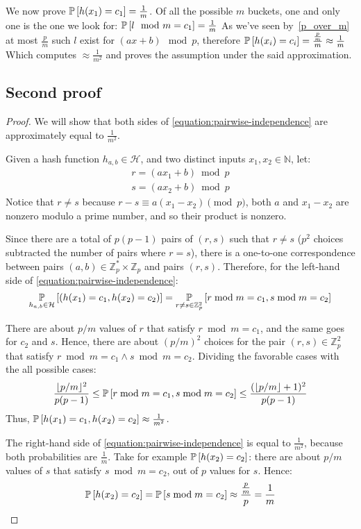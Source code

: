 We now prove $\operatorname*{\mathbb{P}}\left[{h(x_{1}) = c_{1}}\right] = \frac{1}{m}$.
Of all the possible $m$ buckets, one and only one is the one we look for:
$\operatorname*{\mathbb{P}}\left[{l \mod m = c_{1}}\right] = \frac{1}{m}$
As we've seen by~\ref{p_over_m} at most $\frac{p}{m}$ such $l$ exist for $(a x + b) \mod p$,
therefore $\operatorname*{\mathbb{P}}\left[{h(x_i) = c_{i}}\right] = \frac{\frac{p}{m}}{m} \approx \frac{1}{m}$
Which computes $\approx \frac{1}{m^{2}}$ and proves the assumption under the said approximation.

\subsection{Second proof}

\begin{proof}
We will show that both sides of  \eqref{equation:pairwise-independence} are approximately equal to $\frac{1}{m^2}$.

Given a hash function $h_{a,b} \in \mathcal{H}$, and two distinct inputs $x_1, x_2 \in \mathbb{N}$, let:
\begin{align*}
  r = (a x_1 + b) \bmod p\\
  s = (a x_2 + b) \bmod p
\end{align*}
Notice that $r \ne s$ because $r - s \equiv a(x_1-x_2) \pmod p $,  both $a$ and $x_1-x_2$ are nonzero modulo a prime number, and so their product is nonzero.

Since there are a total of $p(p-1)$ pairs of $(r, s)$ such that $r \ne s$ ($p^2$ choices subtracted the number of pairs where $r=s$), there is a one-to-one correspondence between pairs $(a, b)\in \mathbb{Z}_p^*\times\mathbb{Z}_p$ and pairs $(r, s)$. Therefore, for the left-hand side of \eqref{equation:pairwise-independence}:
$$\operatorname*{\mathbb{P}}_{h_{a,b}\in\mathcal{H}}\left[{(h(x_1)= c_1, h(x_2) = c_2)}\right] = \operatorname*{\mathbb{P}}_{r\ne s\in\mathbb{Z}_p^2}\left[{r \bmod m = c_1, s \bmod m = c_2}\right]$$

There are about $p / m$ values of $r$ that satisfy $r \bmod m=c_1$, and the same goes for $c_2$ and $s$. Hence, there are about $(p / m)^2$ choices for the pair $(r, s) \in \mathbb{Z}_p^2$ that satisfy $r \bmod m = c_1 \wedge s \bmod m = c_2$. Dividing the favorable cases with the all possible cases:
$$\frac{\lfloor p / m \rfloor^2}{p(p-1)}\le\operatorname*{\mathbb{P}}\left[{r \bmod m = c_1, s \bmod m = c_2}\right]\le \frac{(\lfloor p / m \rfloor + 1)^2}{p(p-1)}$$
Thus, $\operatorname*{\mathbb{P}}\left[{h(x_1)= c_1, h(x_2) = c_2}\right]\approx \frac{1}{m^2}$.

\vspace{10pt}
The right-hand side of \eqref{equation:pairwise-independence} is equal to  $\frac{1}{m^2}$, because both probabilities are $\frac{1}{m}$. Take for example $\operatorname*{\mathbb{P}}\left[{h(x_2) = c_2}\right]$: there are about $p / m$ values of $s$ that satisfy $s \bmod m = c_2$, out of $p$ values for $s$. Hence:
$$\operatorname*{\mathbb{P}}\left[{h(x_2) = c_2}\right] = \operatorname*{\mathbb{P}}\left[{s \bmod m = c_2}\right] \approx \frac{\frac{p}{m}}{p} = \frac{1}{m}$$


\end{proof}